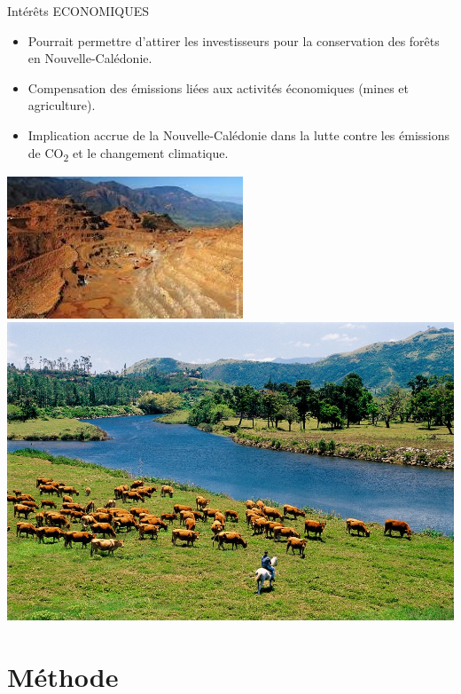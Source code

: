\documentclass[10pt,table,dvipsnames,compress]{beamer}
\begin{document}
\begin{frame}[label={sec:org8f06009}]{Intérêts ECONOMIQUES}
\begin{itemize}
\item \alert{Pourrait} permettre d'attirer les investisseurs pour la conservation des forêts en Nouvelle-Calédonie.
\item Compensation des émissions liées aux activités économiques (mines et agriculture).
\item Implication accrue de la Nouvelle-Calédonie dans la lutte contre les émissions de CO\textsubscript{2} et le changement climatique.
\end{itemize}

\vspace{0.25cm}

\begin{center}
\includegraphics[height=0.3\textheight]{figs/mines.jpg}
\includegraphics[height=0.3\textheight]{figs/agriculture.jpg}
\end{center}
\end{frame}


\section{Méthode}
\label{sec:orge8065df}
\end{document}

